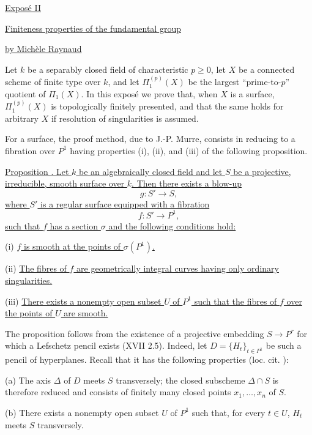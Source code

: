 
\begin{center}
\underline{Expos\'e II}

\vspace{1em}
\underline{\underline{Finiteness properties of the fundamental group}}

\vspace{1em}
\underline{by Mich\`ele Raynaud}
\end{center}

Let $k$ be a separably closed field of characteristic $p\geq 0$, let
$X$ be a connected scheme of finite type over $k$, and let
$\Pi_1^{(p)}(X)$ be the largest ``prime-to-$p$'' quotient of $\Pi_1(X)$.
In this expos\'e we prove that, when $X$ is a surface,
$\Pi_1^{(p)}(X)$ is topologically finitely presented, and that the same
holds for arbitrary $X$ if resolution of singularities is assumed.

For a surface, the proof method, due to J.-P. Murre, consists in reducing
to a fibration over $P^1$ having properties (i), (ii), and (iii) of the
following proposition.

\underline{Proposition . Let $k$ be an algebraically closed field and
let $S$ be a projective, irreducible, smooth surface over $k$. Then there
exists a blow-up}
\[
 g:S'\longrightarrow S,
\]
\underline{where $S'$ is a regular surface equipped with a fibration}
\[
 f:S'\longrightarrow P^1,
\]
\underline{such that $f$ has a section $\sigma$ and the following
conditions hold:}

(i) \underline{$f$ is smooth at the points of $\sigma(P^1)$.}

(ii) \underline{The fibres of $f$ are geometrically integral curves
having only ordinary singularities.}

(iii) \underline{There exists a nonempty open subset $U$ of $P^1$ such
that the fibres of $f$ over the points of $U$ are smooth.}

The proposition follows from the existence of a projective embedding
$S\longrightarrow P^r$ for which a Lefschetz pencil exists (XVII 2.5).
Indeed, let $D=\{H_t\}_{t\in P^1}$ be such a pencil of hyperplanes. Recall
that it has the following properties (loc. cit. ):


(a) The axis $\Delta$ of $D$ meets $S$ transversely; the closed
subscheme $\Delta\cap S$ is therefore reduced and consists of finitely
many closed points $x_1,\ldots,x_n$ of $S$.

(b) There exists a nonempty open subset $U$ of $P^1$ such that, for
every $t\in U$, $H_t$ meets $S$ transversely.

